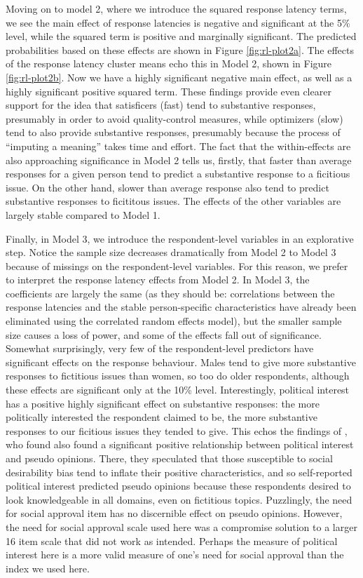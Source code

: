 \documentclass[Royal,times,sageh]{sagej}
\begin{document}
Moving on to model 2, where we introduce the squared response latency
terms, we see the main effect of response latencies is negative and
significant at the 5\% level, while the squared term is positive and
marginally significant. The predicted probabilities based on these
effects are shown in Figure \ref{fig:rl-plot2a}. The effects of the
response latency cluster means echo this in Model 2, shown in Figure
\ref{fig:rl-plot2b}. Now we have a highly significant negative main
effect, as well as a highly significant positive squared term. These
findings provide even clearer support for the idea that satisficers
(fast) tend to substantive responses, presumably in order to avoid
quality-control measures, while optimizers (slow) tend to also provide
substantive responses, presumably because the process of ``imputing a
meaning'' takes time and effort. The fact that the within-effects are
also approaching significance in Model 2 tells us, firstly, that faster
than average responses for a given person tend to predict a substantive
response to a ficitious issue. On the other hand, slower than average
response also tend to predict substantive responses to ficititous
issues. The effects of the other variables are largely stable compared
to Model 1.

Finally, in Model 3, we introduce the respondent-level variables in an
explorative step. Notice the sample size decreases dramatically from
Model 2 to Model 3 because of missings on the respondent-level
variables. For this reason, we prefer to interpret the response latency
effects from Model 2. In Model 3, the coefficients are largely the same
(as they should be: correlations between the response latencies and the
stable person-specific characteristics have already been eliminated
using the correlated random effects model), but the smaller sample size
causes a loss of power, and some of the effects fall out of
significance. Somewhat surprisingly, very few of the respondent-level
predictors have significant effects on the response behaviour. Males
tend to give more substantive responses to fictitious issues than women,
so too do older respondents, although these effects are significant only
at the 10\% level. Interestingly, political interest has a positive
highly significant effect on substantive responses: the more politically
interested the respondent claimed to be, the more substantive responses
to our ficitious issues they tended to give. This echos the findings of
\citet{Sturgis2010}, who found also found a significant positive
relationship between political interest and pseudo opinions. There, they
speculated that those susceptible to social desirability bias tend to
inflate their positive characteristics, and so self-reported political
interest predicted pseudo opinions because these respondents desired to
look knowledgeable in all domains, even on fictitious topics.
Puzzlingly, the need for social approval item has no discernible effect
on pseudo opinions. However, the need for social approval scale used
here was a compromise solution to a larger 16 item scale that did not
work as intended. Perhaps the measure of political interest here is a
more valid measure of one's need for social approval than the index we
used here.
\end{document}
